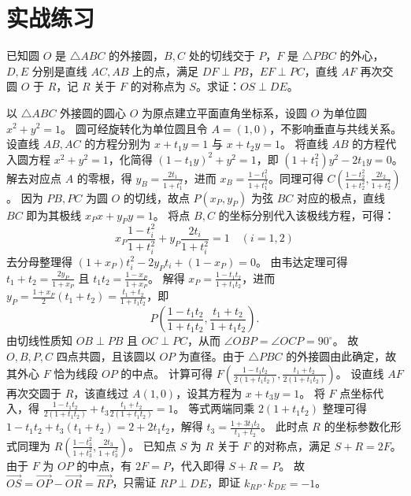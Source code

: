 ﻿\chapter{实战练习}


\begin{exercise}
已知圆 \(O\) 是 \(\triangle ABC\) 的外接圆，\(B,C\) 处的切线交于 \(P\)，\(F\) 是 \(\triangle PBC\) 的外心，\(D,E\) 分别是直线 \(AC,AB\) 上的点，满足 \(DF \perp PB\)，\(EF \perp PC\)，直线 \(AF\) 再次交圆 \(O\) 于 \(R\)，记 \(R\) 关于 \(F\) 的对称点为 \(S\)。求证：\(OS \perp DE\)。
\end{exercise}
\begin{solution}
以 $\triangle ABC$ 外接圆的圆心 $O$ 为原点建立平面直角坐标系，设圆 $O$ 为单位圆 $x^2+y^2=1$。
圆可经旋转化为单位圆且令 $A=(1,0)$，不影响垂直与共线关系。
设直线 $AB, AC$ 的方程分别为 $x + t_1 y = 1$ 与 $x + t_2 y = 1$。
将直线 $AB$ 的方程代入圆方程 $x^2 + y^2 = 1$，化简得 $(1-t_1 y)^2 + y^2 = 1$，即 $(1+t_1^2)y^2 - 2t_1 y = 0$。
解去对应点 $A$ 的零根，得 $y_B = \frac{2t_1}{1+t_1^2}$，进而 $x_B = \frac{1-t_1^2}{1+t_1^2}$。同理可得 $C\left(\frac{1-t_2^2}{1+t_2^2}, \frac{2t_2}{1+t_2^2}\right)$。
因为 $PB, PC$ 为圆 $O$ 的切线，故点 $P(x_P, y_P)$ 为弦 $BC$ 对应的极点，直线 $BC$ 即为其极线 $x_P x + y_P y = 1$。
将点 $B, C$ 的坐标分别代入该极线方程，可得：
\[ x_P \frac{1-t_i^2}{1+t_i^2} + y_P \frac{2t_i}{1+t_i^2} = 1 \quad (i=1,2) \]
去分母整理得 $(1+x_P)t_i^2 - 2y_P t_i + (1-x_P) = 0$。
由韦达定理可得 $t_1+t_2 = \frac{2y_P}{1+x_P}$ 且 $t_1 t_2 = \frac{1-x_P}{1+x_P}$。
解得 $x_P = \frac{1-t_1 t_2}{1+t_1 t_2}$，进而 $y_P = \frac{1+x_P}{2}(t_1+t_2) = \frac{t_1+t_2}{1+t_1 t_2}$，即
\[
P\left(\frac{1-t_1 t_2}{1+t_1 t_2}, \frac{t_1+t_2}{1+t_1 t_2}\right).
\]
由切线性质知 $OB \perp PB$ 且 $OC \perp PC$，从而 $\angle OBP = \angle OCP = 90^\circ$。
故 $O, B, P, C$ 四点共圆，且该圆以 $OP$ 为直径。由于 $\triangle PBC$ 的外接圆由此确定，故其外心 $F$ 恰为线段 $OP$ 的中点。
计算可得 $F\left( \frac{1-t_1 t_2}{2(1+t_1 t_2)}, \frac{t_1+t_2}{2(1+t_1 t_2)} \right)$。
设直线 $AF$ 再次交圆于 $R$，该直线过 $A(1,0)$，设其方程为 $x + t_3 y = 1$。
将 $F$ 点坐标代入，得 $\frac{1-t_1 t_2}{2(1+t_1 t_2)} + t_3 \frac{t_1+t_2}{2(1+t_1 t_2)} = 1$。
等式两端同乘 $2(1+t_1 t_2)$ 整理可得 $1-t_1 t_2 + t_3(t_1+t_2) = 2+2t_1 t_2$，解得 $t_3 = \frac{1+3t_1 t_2}{t_1+t_2}$。
此时点 $R$ 的坐标参数化形式同理为 $R\left(\frac{1-t_3^2}{1+t_3^2}, \frac{2t_3}{1+t_3^2}\right)$。
已知点 $S$ 为 $R$ 关于 $F$ 的对称点，满足 $S + R = 2F$。
由于 $F$ 为 $OP$ 的中点，有 $2F = P$，代入即得 $S + R = P$。
故 $\overrightarrow{OS} = \overrightarrow{OP} - \overrightarrow{OR} = \overrightarrow{RP}$，只需证 $RP \perp DE$，即证 $k_{RP} \cdot k_{DE} = -1$。

\end{solution}
